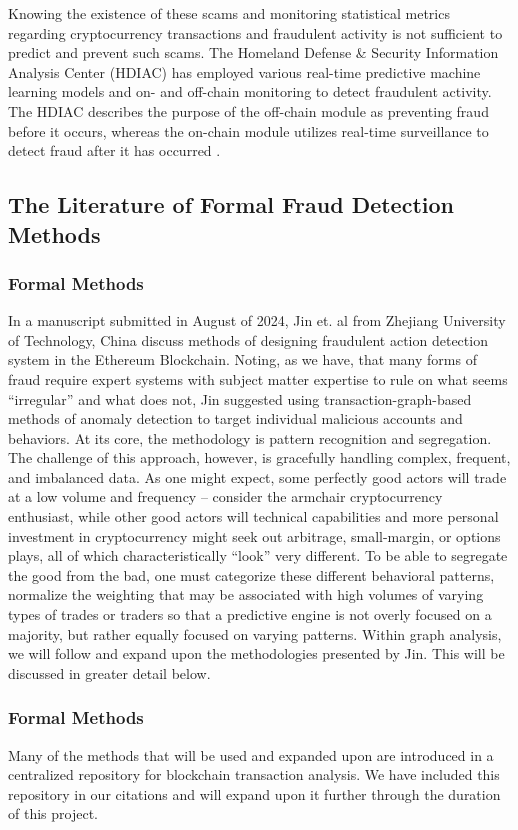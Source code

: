 \documentclass[sigconf]{acmart}
\begin{document}
Knowing the existence of these scams and monitoring statistical metrics regarding cryptocurrency transactions and fraudulent activity is not sufficient to predict and prevent such scams. The Homeland Defense \& Security Information Analysis Center (HDIAC) has employed various real-time predictive machine learning models and on- and off-chain monitoring to detect fraudulent activity. The HDIAC describes the purpose of the off-chain module as preventing fraud before it occurs, whereas the on-chain module utilizes real-time surveillance to detect fraud after it has occurred \cite{HDIAC2023}.
\subsection{The Literature of Formal Fraud Detection Methods}
\subsubsection{Formal Methods}
In a manuscript submitted in August of 2024, Jin et. al from Zhejiang University of Technology, China discuss methods of designing fraudulent action detection system in the Ethereum Blockchain. Noting, as we have, that many forms of fraud require expert systems with subject matter expertise to rule on what seems “irregular” and what does not, Jin suggested using transaction-graph-based methods of anomaly detection to target individual malicious accounts and behaviors. At its core, the methodology is pattern recognition and segregation. The challenge of this approach, however, is gracefully handling complex, frequent, and imbalanced data. As one might expect, some perfectly good actors will trade at a low volume and frequency – consider the armchair cryptocurrency enthusiast, while other good actors will technical capabilities and more personal investment in cryptocurrency might seek out arbitrage, small-margin, or options plays, all of which characteristically “look” very different. To be able to segregate the good from the bad, one must categorize these different behavioral patterns, normalize the weighting that may be associated with high volumes of varying types of trades or traders so that a predictive engine is not overly focused on a majority, but rather equally focused on varying patterns.
Within graph analysis, we will follow and expand upon the methodologies presented by Jin. This will be discussed in greater detail below.
\cite{EnhancingEthereumFraudDetection}
\subsubsection{Formal Methods}
Many of the methods that will be used and expanded upon are introduced in a centralized repository for blockchain transaction analysis. We have included this repository in our citations and will expand upon it further through the duration of this project.
\cite{LiteratureRepo}
\end{document}
